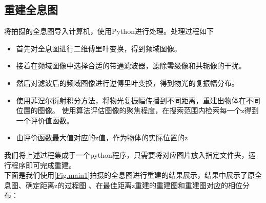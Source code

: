 \documentclass[a4paper,draft]{report}
\begin{document}
\subsection{重建全息图}
将拍摄的全息图导入计算机，使用Python进行处理。处理过程如下\\
\begin{itemize}
    \item 首先对全息图进行二维傅里叶变换，得到频域图像。
    \item 接着在频域图像中选择合适的带通滤波器，滤除零级像和共轭像的干扰。
    \item 然后对滤波后的频域图像进行逆傅里叶变换，得到物光的复振幅分布。
    \item 使用菲涅尔衍射积分方法，将物光复振幅传播到不同距离，重建出物体在不同位置的图像。
    使用算法评估图像的聚焦程度，在搜索范围内检索每一个z得到一个评价值函数。
    \item 由评价函数最大值对应的z值，作为物体的实际位置的z
\end{itemize}
我们将上述过程集成于一个python程序，只需要将对应图片放入指定文件夹，运行程序即可完成重建。\\
下面是我们使用\ref{Fig.main1}拍摄的全息图进行重建的结果展示，结果中展示了原全息图、确定距离z的过程图
、在最佳距离z重建的重建图和重建图对应的相位分布：
\end{document}
